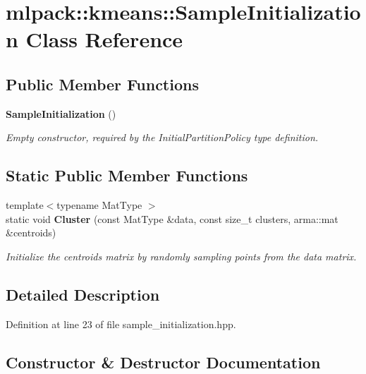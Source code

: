 \section{mlpack\+:\+:kmeans\+:\+:Sample\+Initialization Class Reference}
\label{classmlpack_1_1kmeans_1_1SampleInitialization}
\subsection*{Public Member Functions}
\begin{DoxyCompactItemize}
\item 
{\bf Sample\+Initialization} ()
\begin{DoxyCompactList}\small\item\em Empty constructor, required by the Initial\+Partition\+Policy type definition. \end{DoxyCompactList}\end{DoxyCompactItemize}
\subsection*{Static Public Member Functions}
\begin{DoxyCompactItemize}
\item 
{\footnotesize template$<$typename Mat\+Type $>$ }\\static void {\bf Cluster} (const Mat\+Type \&data, const size\+\_\+t clusters, arma\+::mat \&centroids)
\begin{DoxyCompactList}\small\item\em Initialize the centroids matrix by randomly sampling points from the data matrix. \end{DoxyCompactList}\end{DoxyCompactItemize}


\subsection{Detailed Description}


Definition at line 23 of file sample\+\_\+initialization.\+hpp.



\subsection{Constructor \& Destructor Documentation}
